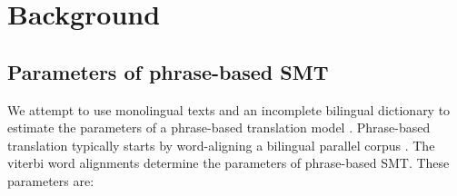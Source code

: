 \documentclass[11pt]{article}
\newcommand{\todo}[1]{\textcolor{red}{TODO: #1}}
\begin{document}




\section{Background} \label{sect:bckg}
\subsection{Parameters of phrase-based SMT} \label{sect:bckg:smt}

We attempt to use monolingual texts and an incomplete bilingual dictionary to estimate the parameters of a phrase-based translation  model \cite{Koehn:2003,Moses}.  Phrase-based translation typically starts by word-aligning a bilingual parallel corpus \cite{Och2003}.  The viterbi word alignments determine the parameters of phrase-based SMT.  These parameters are:
\end{document}
